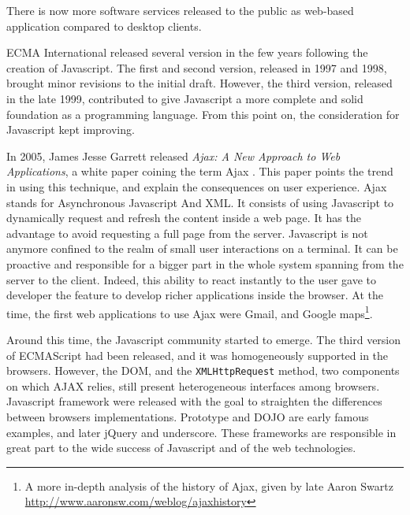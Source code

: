 There is now more software services released to the public as web-based application compared to desktop clients.

ECMA International released several version in the few years following the creation of Javascript.
The first and second version, released in 1997 and 1998, brought minor revisions to the initial draft.
However, the third version, released in the late 1999, contributed to give Javascript a more complete and solid foundation as a programming language.
From this point on, the consideration for Javascript kept improving.

In 2005, James Jesse Garrett released \textit{Ajax: A New Approach to Web Applications}, a white paper coining the term Ajax \cite{Garrett2005}.
This paper points the trend in using this technique, and explain the consequences on user experience.
Ajax stands for Asynchronous Javascript And XML.
It consists of using Javascript to dynamically request and refresh the content inside a web page.
It has the advantage to avoid requesting a full page from the server.
Javascript is not anymore confined to the realm of small user interactions on a terminal.
It can be proactive and responsible for a bigger part in the whole system spanning from the server to the client.
Indeed, this ability to react instantly to the user gave to developer the feature to develop richer applications inside the browser.
At the time, the first web applications to use Ajax were Gmail, and Google maps\footnote{A more in-depth analysis of the history of Ajax, given by late Aaron Swartz \url{http://www.aaronsw.com/weblog/ajaxhistory}}.

Around this time, the Javascript community started to emerge.
The third version of ECMAScript had been released, and it was homogeneously supported in the browsers.
However, the DOM, and the \texttt{XMLHttpRequest} method, two components on which AJAX relies, still present heterogeneous interfaces among browsers.
Javascript framework were released with the goal to straighten the differences between browsers implementations.
Prototype and DOJO are early famous examples, and later jQuery and underscore.
These frameworks are responsible in great part to the wide success of Javascript and of the web technologies.


